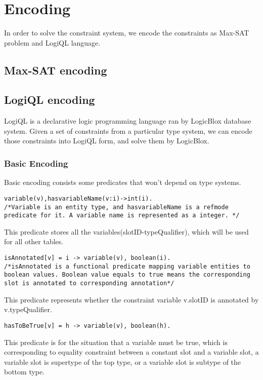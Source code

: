 \documentclass[11pt]{article}
\begin{document}
\section{Encoding}
In order to solve the constraint system, we encode the constraints as Max-SAT problem and LogiQL language. 

\subsection{Max-SAT encoding}


\subsection{LogiQL encoding}
LogiQL is a declarative logic programming language ran by LogicBlox database system. Given a set of constraints from a particular type system, we can encode those constraints into LogiQL form, and solve them by LogicBlox.
\subsubsection{Basic Encoding} 
Basic encoding consists some predicates that won't depend on type systems.
\begin{lstlisting}
variable(v),hasvariableName(v:i)->int(i).
/*Variable is an entity type, and hasvariableName is a refmode predicate for it. A variable name is represented as a integer. */ 
\end{lstlisting}
This predicate stores all the variables(slotID-typeQualifier), which will be used for all other tables. 

\begin{lstlisting}
isAnnotated[v] = i -> variable(v), boolean(i).
/*isAnnotated is a functional predicate mapping variable entities to boolean values. Boolean value equals to true means the corresponding slot is annotated to corresponding annotation*/ 
\end{lstlisting}
This predicate represents whether the constraint variable v.slotID is annotated by v.typeQualifier.

\begin{lstlisting}
hasToBeTrue[v] = h -> variable(v), boolean(h).
\end{lstlisting}
This predicate is for the situation that a variable must be true, which is corresponding to equality constraint between a constant slot and a variable slot, a variable slot is supertype of the top type, or a variable slot is subtype of the bottom type.
\end{document}
